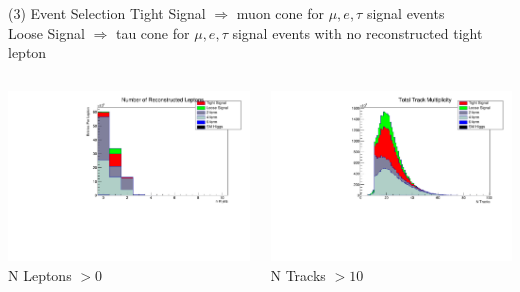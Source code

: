 \documentclass[10pt]{beamer}
\begin{document}
\begin{frame}{(3) Event Selection}
\scriptsize
Tight Signal $\Rightarrow$  muon cone for $\mu,e,\tau$ signal events\\
Loose Signal $\Rightarrow$  tau cone for $\mu,e,\tau$ signal events with no reconstructed tight lepton\\
\begin{columns}
\begin{column}{0.5\textwidth}
\includegraphics[scale=0.3, left]{nLepHist.pdf} \\
N Leptons $> 0$
\end{column}
\begin{column}{0.5\textwidth}
\includegraphics[scale=0.3, left]{ntracksHist.pdf} \\
N Tracks $> 10$
\end{column}
\end{columns}
\end{frame}
\end{document}
